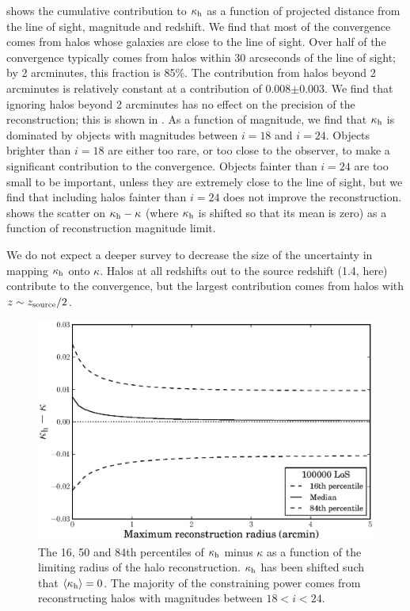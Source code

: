 \documentclass[useAMS,usenatbib]{mn2e}
\begin{document}
 shows the cumulative contribution to $\kappa_{\rm h}$ as a function
of projected distance from the line of sight, magnitude and redshift. We find
that most of the convergence comes from halos whose galaxies are close to the
line of sight.  Over half of the  convergence typically comes from halos
within 30 arcseconds of the line of sight; by 2 arcminutes, this fraction is
85\%. The contribution from halos beyond 2 arcminutes is relatively constant
at a contribution of 0.008$\pm$0.003. We find that ignoring halos beyond 2
arcminutes has no effect on the precision of the reconstruction; this is shown
in . As a function of magnitude, we find that $\kappa_{\rm h}$
is dominated by objects with magnitudes between $i=18$ and $i=24$. Objects
brighter than $i=18$ are either too rare, or too close to the observer, to
make a significant contribution to the convergence. Objects fainter than
$i=24$ are too small to be important, unless they are extremely close to the
line of sight, but we find that including halos fainter than $i=24$ does not
improve the reconstruction.   shows the scatter on
$\kappa_{\rm h}-\kappa$ (where $\kappa_{\rm h}$ is shifted so that its mean is zero) as a
function of reconstruction magnitude limit. 

%
%
We do
not expect a deeper survey to decrease the size of the uncertainty in mapping
$\kappa_{\rm h}$ onto $\kappa$. Halos at all redshifts out to the source redshift
(1.4, here) contribute to the convergence, but the largest contribution comes from
halos with $z \sim z_{\rm source}/2$.

\begin{figure}
\includegraphics[width=\columnwidth]{figs/radius_scatter.eps}
\caption[magcut]{The 16, 50 and 84th percentiles of $\kappa_{\rm h}$ minus
$\kappa$ as a function of the limiting radius of the halo
reconstruction. $\kappa_{\rm h}$ has been shifted such that
$\left\langle\kappa_{\rm h}\right\rangle=0$. The majority of the constraining power
comes from reconstructing halos with magnitudes between $18<i<24$.}
\label{fig:radcut}
\end{figure}
\end{document}
